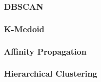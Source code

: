 \documentclass[a4paper, 12pt]{article}
\begin{document}
\subsubsection{DBSCAN}
\subsubsection{K-Medoid}
\subsubsection{Affinity Propagation}
\subsubsection{Hierarchical Clustering}


\end{document}
